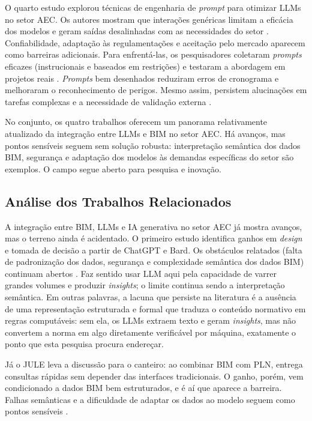 O quarto estudo explorou técnicas de engenharia de \textit{prompt} para otimizar LLMs no setor AEC. Os autores mostram que interações genéricas limitam a eficácia dos modelos e geram saídas desalinhadas com as necessidades do setor \cite{samsami2024}. Confiabilidade, adaptação às regulamentações e aceitação pelo mercado aparecem como barreiras adicionais. Para enfrentá-las, os pesquisadores coletaram \textit{prompts} eficazes (instrucionais e baseados em restrições) e testaram a abordagem em projetos reais \cite{samsami2024}. \textit{Prompts} bem desenhados reduziram erros de cronograma e melhoraram o reconhecimento de perigos. Mesmo assim, persistem alucinações em tarefas complexas e a necessidade de validação externa \cite{samsami2024}.

No conjunto, os quatro trabalhos oferecem um panorama relativamente atualizado da integração entre LLMs e BIM no setor AEC. Há avanços, mas pontos sensíveis seguem sem solução robusta: interpretação semântica dos dados BIM, segurança e adaptação dos modelos às demandas específicas do setor são exemplos. O campo segue aberto para pesquisa e inovação.

\subsection{Análise dos Trabalhos Relacionados}

A integração entre BIM, LLMs e IA generativa no setor AEC já mostra avanços, mas o terreno ainda é acidentado. O primeiro estudo identifica ganhos em \textit{design} e tomada de decisão a partir de ChatGPT e Bard. Os obstáculos relatados (falta de padronização dos dados, segurança e complexidade semântica dos dados BIM) continuam abertos \cite{rane2023}. Faz sentido usar LLM aqui pela capacidade de varrer grandes volumes e produzir \textit{insights}; o limite continua sendo a interpretação semântica. Em outras palavras, a lacuna que persiste na literatura é a ausência de uma representação estruturada e formal que traduza o conteúdo normativo em regras computáveis: sem ela, os LLMs extraem texto e geram \textit{insights}, mas não convertem a norma em algo diretamente verificável por máquina, exatamente o ponto que esta pesquisa procura endereçar.

Já o JULE leva a discussão para o canteiro: ao combinar BIM com PLN, entrega consultas rápidas sem depender das interfaces tradicionais. O ganho, porém, vem condicionado a dados BIM bem estruturados, e é aí que aparece a barreira. Falhas semânticas e a dificuldade de adaptar os dados ao modelo seguem como pontos sensíveis \cite{lin2023}.

